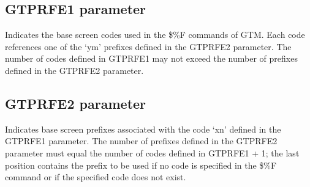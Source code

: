 \documentclass[letterpaper,10pt,english]{sphinxmanual}
\begin{document}
\ignorespaces 

\subsection{GTPRFE1 parameter}
\label{\detokenize{Installation_Guide:gtprfe1-parameter}}\label{\detokenize{Installation_Guide:index-71}}
\begin{sphinxVerbatim}[commandchars=\\\{\}]
    
\end{sphinxVerbatim}

\sphinxAtStartPar
{} \sphinxhyphen{} Indicates the base screen codes used in the \$\%F commands of GTM. Each code references one of the ‘ym’ prefixes defined in the GTPRFE2 parameter. The number of codes defined in GTPRFE1 may not exceed the number of prefixes defined in the GTPRFE2 parameter.

\ignorespaces 

\subsection{GTPRFE2 parameter}
\label{\detokenize{Installation_Guide:gtprfe2-parameter}}\label{\detokenize{Installation_Guide:index-72}}
\begin{sphinxVerbatim}[commandchars=\\\{\}]
     
\end{sphinxVerbatim}

\sphinxAtStartPar
{} \sphinxhyphen{} Indicates base screen prefixes associated with the code ‘xn’ defined in the GTPRFE1 parameter. The number of prefixes defined in the GTPRFE2 parameter must equal the number of codes defined in GTPRFE1 + 1; the last position contains the prefix to be used if no code is specified in the \$\%F command or if the specified code does not exist.
\end{document}
